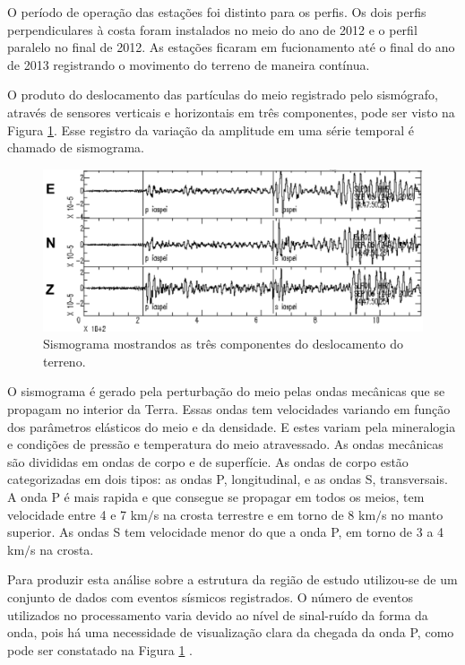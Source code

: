 O período de operação das estações foi distinto para os perfis. Os dois perfis perpendiculares à costa foram instalados no meio do ano de 2012 e o perfil paralelo no final de 2012. As estações ficaram em fucionamento até o final do ano de 2013 registrando o movimento do terreno de maneira contínua. 

O produto do deslocamento das partículas do meio registrado pelo sismógrafo, através de sensores verticais e horizontais em três componentes, pode ser visto na Figura \ref{figura2}. Esse registro da variação da amplitude em uma série temporal é chamado de sismograma. 

\begin{figure}[!ht]
\centering
\includegraphics[scale=0.6]{sismograma.png}
\caption{Sismograma mostrandos as três componentes do deslocamento do terreno.}
\label{figura2}
\end{figure}

O sismograma é gerado pela perturbação do meio pelas ondas  mecânicas que se propagam no interior da Terra. Essas ondas  tem velocidades variando em função dos parâmetros elásticos do meio e da densidade. E estes variam pela mineralogia e condições de pressão e temperatura do meio atravessado. As ondas mecânicas são divididas em ondas de corpo e de superfície. As ondas de corpo estão categorizadas em dois tipos: as ondas P, longitudinal, e as ondas S, transversais. A onda P é mais rapida e que consegue se propagar em todos os meios, tem velocidade entre 4 e 7 km$/$s na crosta terrestre e em torno de 8 km$/$s no manto superior. As ondas S tem velocidade menor do que a onda P, em torno de 3 a 4 km$/$s na crosta.

Para produzir esta análise sobre a estrutura da região de estudo utilizou-se de um conjunto de dados com eventos sísmicos registrados. O número de eventos utilizados no processamento varia devido ao nível de sinal-ruído da forma da onda, pois há uma necessidade de visualização clara da chegada da onda P, como pode ser constatado na Figura \ref{figura2} .


